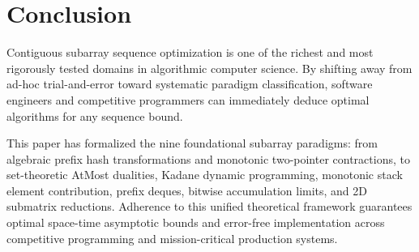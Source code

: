 \documentclass[10pt,journal,compsoc,onecolumn]{IEEEtran}
\begin{document}
\section{Conclusion}
\label{sec:conclusion}

Contiguous subarray sequence optimization is one of the richest and most rigorously tested domains in algorithmic computer science. By shifting away from ad-hoc trial-and-error toward systematic paradigm classification, software engineers and competitive programmers can immediately deduce optimal algorithms for any sequence bound. 

This paper has formalized the nine foundational subarray paradigms: from algebraic prefix hash transformations and monotonic two-pointer contractions, to set-theoretic AtMost dualities, Kadane dynamic programming, monotonic stack element contribution, prefix deques, bitwise accumulation limits, and 2D submatrix reductions. Adherence to this unified theoretical framework guarantees optimal space-time asymptotic bounds and error-free implementation across competitive programming and mission-critical production systems.

\end{document}

